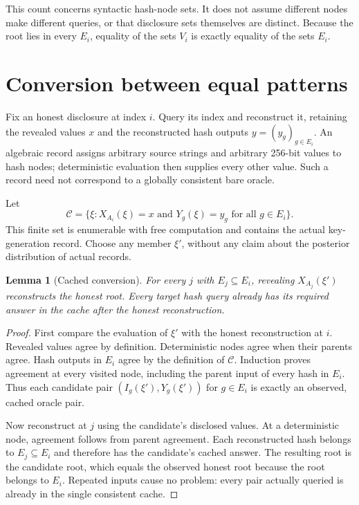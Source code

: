 \documentclass[10pt]{article}
\newtheorem{lemma}[theorem]{Lemma}
\begin{document}
This count concerns syntactic hash-node sets. It does not assume different nodes make different queries, or that disclosure sets themselves are distinct. Because the root lies in every $E_i$, equality of the sets $V_i$ is exactly equality of the sets $E_i$.

\section{Conversion between equal patterns}\label{sec:conversion}

Fix an honest disclosure at index $i$. Query its index and reconstruct it, retaining the revealed values $x$ and the reconstructed hash outputs $y=(y_g)_{g\in E_i}$. An algebraic record assigns arbitrary source strings and arbitrary 256-bit values to hash nodes; deterministic evaluation then supplies every other value. Such a record need not correspond to a globally consistent bare oracle.

Let
\[
\mathcal C=\{\xi:X_{A_i}(\xi)=x\text{ and }Y_g(\xi)=y_g\text{ for all }g\in E_i\}.
\]
This finite set is enumerable with free computation and contains the actual key-generation record. Choose any member $\xi'$, without any claim about the posterior distribution of actual records.

\begin{lemma}[Cached conversion]\label{lem:conversion}
For every $j$ with $E_j\subseteq E_i$, revealing $X_{A_j}(\xi')$ reconstructs the honest root. Every target hash query already has its required answer in the cache after the honest reconstruction.
\end{lemma}
\begin{proof}
First compare the evaluation of $\xi'$ with the honest reconstruction at $i$. Revealed values agree by definition. Deterministic nodes agree when their parents agree. Hash outputs in $E_i$ agree by the definition of $\mathcal C$. Induction proves agreement at every visited node, including the parent input of every hash in $E_i$. Thus each candidate pair $(I_g(\xi'),Y_g(\xi'))$ for $g\in E_i$ is exactly an observed, cached oracle pair.

Now reconstruct at $j$ using the candidate's disclosed values. At a deterministic node, agreement follows from parent agreement. Each reconstructed hash belongs to $E_j\subseteq E_i$ and therefore has the candidate's cached answer. The resulting root is the candidate root, which equals the observed honest root because the root belongs to $E_i$. Repeated inputs cause no problem: every pair actually queried is already in the single consistent cache.
\end{proof}
\end{document}
